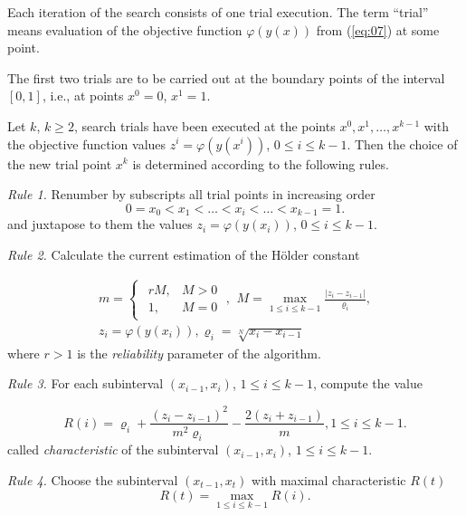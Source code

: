 \documentclass[runningheads]{llncs}
\begin{document}
Each iteration of the search consists of one trial execution. The term ``trial'' means evaluation of the objective function $\varphi(y(x))$ from (\ref{eq:07}) at some point.

The first two trials are to be carried out at the boundary points of the interval $[0,1]$, i.e., at points $x^0=0$, $x^1=1$. 

Let $k$, $k \geq 2$, search trials have been executed at the points $x^0, x^1,\dots,x^{k-1}$ with the objective function values $z^i=\varphi(y(x^i))$, $0 \leq i \leq k-1$. Then the choice of the new trial point $x^k$ is determined according to the following rules.

\textit{Rule 1.} Renumber by subscripts all trial points in increasing order
\begin{equation}
    \label{eq:09}
    0 = x_0 < x_1 < \dots < x_i < \dots < x_{k-1} = 1.
\end{equation}
and juxtapose to them the values $z_i=\varphi(y(x_i))$, $0 \leq i \leq k-1$.

\textit{Rule 2.} Calculate the current estimation of the H{\" o}lder constant 

\begin{equation}
    \label{eq:10}
		\begin{matrix}
		m=\begin{cases}
				\begin{matrix}
					 r M, & M >0 \\
					 1, & M = 0 
				\end{matrix} \; , 
			\end{cases}
		M = \max_{1 \leq i \leq k-1} \frac{| z_i - z_{i-1}|}{\varrho_i}, \\
		z_i = \varphi( y(x_i) ), \varrho_i=\sqrt[N]{x_i-x_{i-1}}
		\end{matrix}
\end{equation}
where $r>1$ is the \textit{reliability} parameter of the algorithm.

\textit{Rule 3.} For each subinterval $(x_{i-1} ,x_i)$, $1 \leq i \leq k-1$, compute the value

\begin{equation}
    \label{eq:11}
    R(i) = \varrho_i + \frac{(z_i-z_{i-1})^2}{m^2 \varrho_i} - \frac{2 (z_i+z_{i-1})}{m}, 1 \leq i \leq k-1.
\end{equation}
called \textit{characteristic} of the subinterval $(x_{i-1} ,x_i)$, $1 \leq i \leq k-1$.

\textit{Rule 4.} Choose the subinterval $(x_{t-1} ,x_t)$ with maximal characteristic $R(t)$
\begin{equation}
    \label{eq:12}
    R(t) = \max_{1 \leq i \leq k-1} {R(i)}.
\end{equation}
\end{document}
